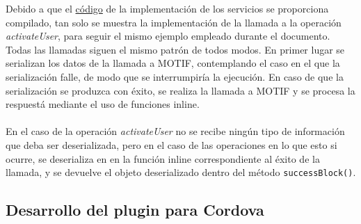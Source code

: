 \documentclass[a4paper, 12pt]{article}
\begin{document}
\bigbreak
Debido a que el \hyperref[code:ios-implementation]{código} de la implementación de los servicios se proporciona compilado, tan solo se muestra la implementación de la llamada a la operación \emph{activateUser},
para seguir el mismo ejemplo empleado durante el documento. Todas las llamadas siguen el mismo patrón de todos modos. En primer lugar se serializan los datos de la llamada a MOTIF, contemplando el caso en
el que la serialización falle, de modo que se interrumpiría la ejecución. En caso de que la serialización se produzca con éxito, se realiza la llamada a MOTIF y se procesa la respuestá mediante el uso de
funciones inline.
\\
\\
En el caso de la operación \emph{activateUser} no se recibe ningún tipo de información que deba ser deserializada, pero en el caso de las operaciones en lo que esto si ocurre, se deserializa en en la función inline
correspondiente al éxito de la llamada, y se devuelve el objeto deserializado dentro del método \verb~successBlock()~.
\subsection{Desarrollo del plugin para Cordova}
\label{sec-4-3}
\end{document}
